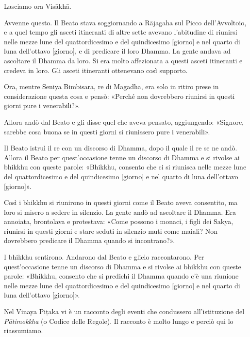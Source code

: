 

 Lasciamo ora Visākhā.


 Avvenne questo. Il Beato stava soggiornando a Rājagaha sul
Picco dell’Avvoltoio, e a quel tempo gli asceti itineranti di altre
sette avevano l’abitudine di riunirsi nelle mezze lune del
quattordicesimo e del quindicesimo [giorno] e nel quarto di luna
dell’ottavo [giorno], e di predicare il loro Dhamma. La gente andava ad
ascoltare il Dhamma da loro. Si era molto affezionata a questi asceti
itineranti e credeva in loro. Gli asceti itineranti ottenevano così
supporto.


Ora, mentre Seniya Bimbisāra, re di Magadha, era solo in ritiro prese in
considerazione questa cosa e pensò: «Perché non dovrebbero riunirsi in
questi giorni pure i venerabili?».


Allora andò dal Beato e gli disse quel che aveva pensato, aggiungendo:
«Signore, sarebbe cosa buona se in questi giorni si riunissero pure i
venerabili».


Il Beato istruì il re con un discorso di Dhamma, dopo il quale il re se
ne andò. Allora il Beato per quest’occasione tenne un discorso di Dhamma
e si rivolse ai bhikkhu con queste parole: «Bhikkhu, consento che ci si
riunisca nelle mezze lune del quattordicesimo e del quindicesimo
[giorno] e nel quarto di luna dell’ottavo [giorno]».


Così i bhikkhu si riunirono in questi giorni come il Beato aveva
consentito, ma loro si misero a sedere in silenzio. La gente andò ad
ascoltare il Dhamma. Era annoiata, brontolava e protestava: «Come
possono i monaci, i figli dei Sakya, riunirsi in questi giorni e stare
seduti in silenzio muti come maiali? Non dovrebbero predicare il Dhamma
quando si incontrano?».


I bhikkhu sentirono. Andarono dal Beato e glielo raccontarono. Per
quest’occasione tenne un discorso di Dhamma e si rivolse ai bhikkhu con
queste parole: «Bhikkhu, consento che si predichi il Dhamma quando c’è
una riunione nelle mezze lune del quattordicesimo e del quindicesimo
[giorno] e nel quarto di luna dell’ottavo [giorno]».




 Nel Vinaya Piṭaka vi è un racconto degli eventi che
condussero all’istituzione del \emph{Pātimokkha} (o Codice delle Regole). Il
racconto è molto lungo e perciò qui lo riassumiamo.


